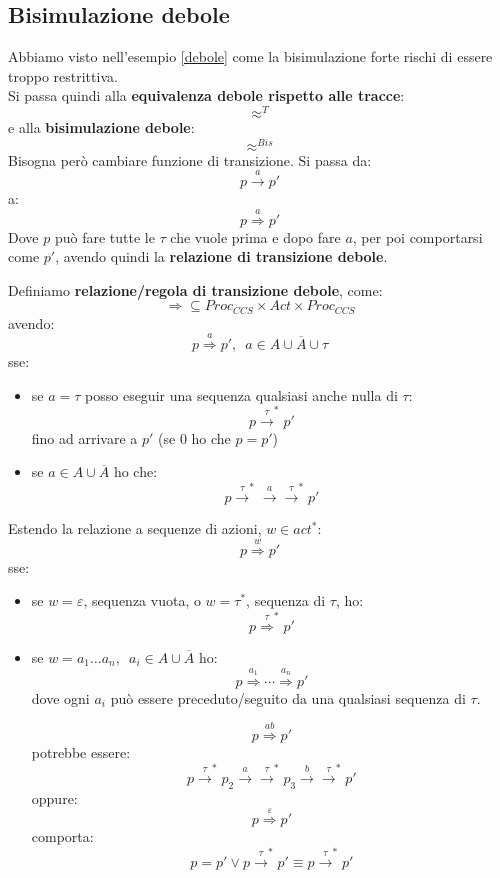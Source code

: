 \documentclass[a4paper,12pt, oneside]{book}
\begin{document}
\subsection{Bisimulazione debole}
Abbiamo visto nell'esempio \ref{debole} come la bisimulazione forte rischi di
essere troppo restrittiva.\\
Si passa quindi alla \textbf{equivalenza debole rispetto alle tracce}:
\[\approx^{T}\]
e alla \textbf{bisimulazione debole}:
\[\approx^{Bis}\]
Bisogna però cambiare funzione di transizione. Si passa da:
\[p\stackrel{a}{\rightarrow}p'\]
a:
\[p\stackrel{a}{\Rightarrow}p'\]
Dove $p$ può fare tutte le $\tau$ che vuole prima e dopo fare $a$, per poi
comportarsi come $p'$, avendo quindi la \textbf{relazione di transizione debole}.
\begin{definizione}
  Definiamo \textbf{relazione/regola di transizione debole}, come:
  \[\Rightarrow\subseteq Proc_{CCS}\times Act\times Proc_{CCS}\]
  avendo:
  \[p\stackrel{a}{\Rightarrow}p',\,\,\,a\in A\cup \overline{A}\cup \tau\]
  sse:
  \begin{itemize}
    \item se $a=\tau$ posso eseguir una sequenza qualsiasi anche nulla di
    $\tau$:
    \[p\stackrel{\tau}{\rightarrow}^*p'\]
    fino ad arrivare a $p'$ (se 0 ho che $p=p'$)
    \item se $a\in A\cup\overline{A}$ ho che:
    \[p\stackrel{\tau}{\rightarrow}^*
      \stackrel{a}{\rightarrow}\stackrel{\tau}{\rightarrow}^*p'\]
  \end{itemize}
  Estendo la relazione a sequenze di azioni, $w\in act^*$:
  \[p\stackrel{w}{\Rightarrow}p'\]
  sse:
  \begin{itemize}
    \item se $w=\varepsilon$, sequenza vuota, o $w=\tau^*$, sequenza di $\tau$,
    ho: 
    \[p\stackrel{\tau}{\Rightarrow}^*p'\]
    
    \item se $w=a_1\ldots a_n,\,\,\,a_i\in A\cup \overline{A}$ ho:
    \[p\stackrel{a_1}{\Rightarrow}\cdots \stackrel{a_n}{\Rightarrow}p'\]
    dove ogni $a_i$ può essere preceduto/seguito da una qualsiasi sequenza di
    $\tau$.
    \begin{esempio}
      \[p\stackrel{ab}{\Rightarrow}p'\]
      potrebbe essere:
      \[p\stackrel{\tau}{\rightarrow}^*p_2\stackrel{a}{\rightarrow}
        \stackrel{\tau}{\rightarrow}^*p_3\stackrel{b}{\rightarrow}
        \stackrel{\tau}{\rightarrow}^*p'\]
      oppure:
      \[p\stackrel{\varepsilon}{\Rightarrow}p'\]
      comporta:
      \[p=p'\lor p \stackrel{\tau}{\rightarrow}^*p'\equiv
        p\stackrel{\tau}{\rightarrow}^*p'\] 
    \end{esempio}
  \end{itemize}
  
\end{definizione}
\end{document}
